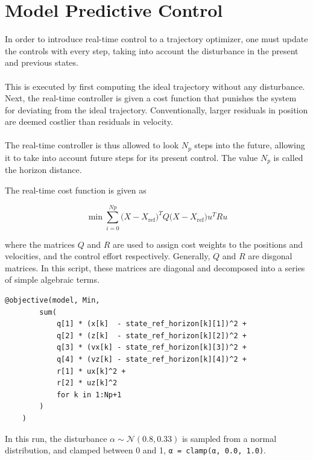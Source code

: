 \documentclass{article}
\begin{document}
\section{Model Predictive Control}

In order to introduce real-time control to a trajectory optimizer, one must update the controls with every step, taking into account the disturbance in the present and previous states.\\
\\
This is executed by first computing the ideal trajectory without any disturbance. Next, the real-time controller is given a cost function that punishes the system for deviating from the ideal trajectory. Conventionally, larger residuals in position are deemed costlier than residuals in velocity.\\
\\

The real-time controller is thus allowed to look $N_p$ steps into the future, allowing it to take into account future steps for its present control. The value $N_p$ is called the horizon distance.

The real-time cost function is given as

\begin{equation}
    \min \sum_{i=0}^{Np} 
    \Big(X - X_\text{ref}\Big)^T Q \Big(X - X_\text{ref}\Big)
    u^T R u
\end{equation}

where the matrices $Q$ and $R$ are used to assign cost weights to the positions and velocities, and the control effort respectively. Generally, $Q$ and $R$ are disgonal matrices. In this script, these matrices are diagonal and decomposed into a series of simple algebraic terms.

\begin{verbatim}
@objective(model, Min,
        sum(
            q[1] * (x[k]  - state_ref_horizon[k][1])^2 +
            q[2] * (z[k]  - state_ref_horizon[k][2])^2 +
            q[3] * (vx[k] - state_ref_horizon[k][3])^2 +
            q[4] * (vz[k] - state_ref_horizon[k][4])^2 +
            r[1] * ux[k]^2 +
            r[2] * uz[k]^2
            for k in 1:Np+1
        )
    )
\end{verbatim}

In this run, the disturbance $\alpha \sim \mathcal{N}(0.8, 0.33)$ is sampled from a normal distribution, and clamped between 0 and 1, \texttt{α = clamp(α, 0.0, 1.0)}.
\end{document}
